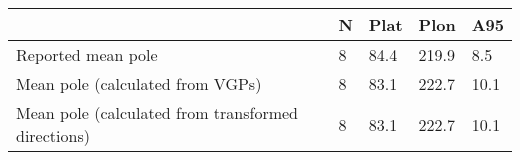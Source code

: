 \begin{tabular}{lllll}
\toprule
{} &  N &  Plat &   Plon &   A95 \\
\midrule
Reported mean pole                                 &  8 &  84.4 &  219.9 &   8.5 \\
Mean pole (calculated from VGPs)                   &  8 &  83.1 &  222.7 &  10.1 \\
Mean pole (calculated from transformed directions) &  8 &  83.1 &  222.7 &  10.1 \\
\bottomrule
\end{tabular}
